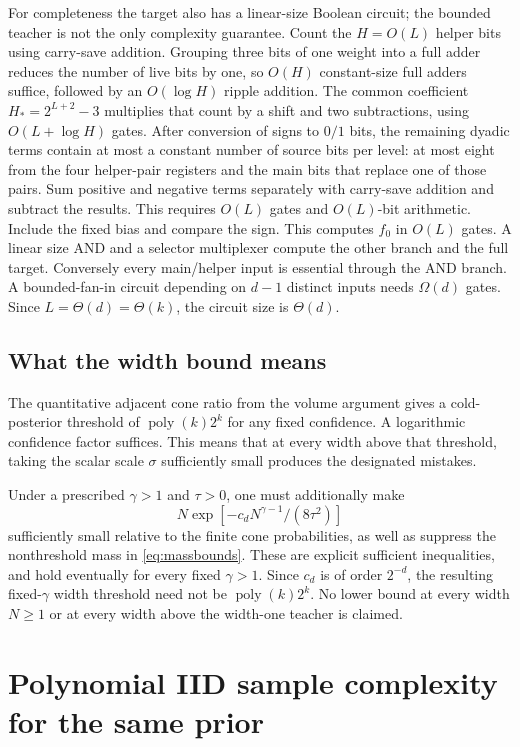 \documentclass[11pt]{article}
\begin{document}
For completeness the target also has a linear-size Boolean circuit;
the bounded teacher is not the only complexity guarantee. Count the
$H=O(L)$ helper bits using carry-save addition. Grouping three bits of
one weight into a full adder reduces the number of live bits by one,
so $O(H)$ constant-size full adders suffice, followed by an
$O(\log H)$ ripple addition. The common coefficient
$H_*=2^{L+2}-3$ multiplies that count by a shift and two subtractions,
using $O(L+\log H)$ gates. After conversion of signs to $0/1$ bits,
the remaining dyadic terms contain at most a constant number of source
bits per level: at most eight from the four helper-pair registers and
the main bits that replace one of those pairs. Sum positive and negative
terms separately with carry-save addition and subtract the results.
This requires $O(L)$ gates and $O(L)$-bit arithmetic. Include the fixed
bias and compare the sign. This computes $f_0$ in $O(L)$ gates. A linear
size AND and a selector multiplexer compute the other branch and the
full target. Conversely every main/helper input is essential through
the AND branch. A bounded-fan-in circuit depending on $d-1$ distinct
inputs needs $\Omega(d)$ gates. Since $L=\Theta(d)=\Theta(k)$, the circuit
size is $\Theta(d)$.

\subsection{What the width bound means}

The quantitative adjacent cone ratio from the volume argument gives a
cold-posterior threshold of $\operatorname{poly}(k)2^k$ for any fixed
confidence. A logarithmic confidence factor suffices. This means that
at every width above that threshold, taking the scalar scale $\sigma$
sufficiently small produces the designated mistakes.

Under a prescribed $\gamma>1$ and $\tau>0$, one must additionally make
\[
 N\exp[-c_dN^{\gamma-1}/(8\tau^2)]
\]
sufficiently small relative to the finite cone probabilities, as well
as suppress the nonthreshold mass in \eqref{eq:massbounds}.
These are explicit sufficient inequalities, and hold eventually for
every fixed $\gamma>1$. Since $c_d$ is of order $2^{-d}$, the resulting
fixed-$\gamma$ width threshold need not be
$\operatorname{poly}(k)2^k$. No lower bound at every width $N\ge1$ or at
every width above the width-one teacher is claimed.

\section{Polynomial IID sample complexity for the same prior}
\end{document}
